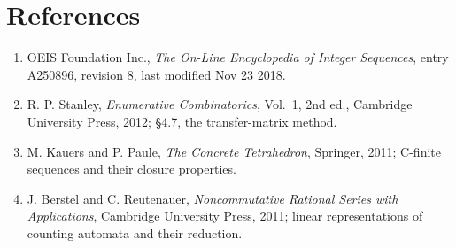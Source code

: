 \documentclass[11pt]{article}
\theoremstyle{definition}
\begin{document}
\section{References}

\begin{enumerate}

\item OEIS Foundation Inc., \emph{The On-Line Encyclopedia of Integer Sequences}, entry \href{https://oeis.org/A250896}{A250896}, revision 8, last modified Nov 23 2018.

\item R. P. Stanley, \emph{Enumerative Combinatorics}, Vol.~1, 2nd ed., Cambridge University Press, 2012; \S4.7, the transfer-matrix method.

\item M. Kauers and P. Paule, \emph{The Concrete Tetrahedron}, Springer, 2011; C-finite sequences and their closure properties.

\item J. Berstel and C. Reutenauer, \emph{Noncommutative Rational Series with Applications}, Cambridge University Press, 2011; linear representations of counting automata and their reduction.

\end{enumerate}
\end{document}
